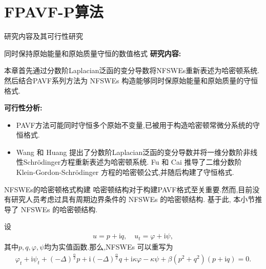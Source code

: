 \documentclass[aspectratio=169]{beamer}
\numberwithin{theorem}{section} %
\numberwithin{equation}{section}%
\numberwithin{figure}{section}%
\numberwithin{table}{section}%
\begin{document}
\section{FPAVF-P算法}
\begin{frame}{研究内容及其可行性研究}
	\begin{block}{同时保持原始能量和原始质量守恒的数值格式}
		\textbf{\textcolor[rgb]{0.227,0.373,0.306}{研究内容:}}
		
		{\footnotesize 本章首先通过分数阶Laplacian泛函的变分导数将NFSWEs重新表述为哈密顿系统.然后结合PAVF系列方法为 NFSWEs 构造能够同时保原始能量和原始质量的守恒格式.}
		
		\textbf{\textcolor[rgb]{0.227,0.373,0.306}{可行性分析:}}
		\begin{itemize}
			\item {\footnotesize PAVF方法可能同时守恒多个原始不变量,已被用于构造哈密顿常微分系统的守恒格式\cite{caiPartitionedAveragedVector2018}.​​​​​​​​​​​​​​​​​​​​​​​​​​​​​​​​​​​​​​​​​​​​​​​​​​​​​​​​​​​​​​​​​​​​​​​​​​​​​​​​​​​​​​​​​​​​​​​​​​​​​​​​​​​​​​​​​​​​​​​​​​​​​​​​​​​​​​​​​​​​​​​​​​​​​​​​​​​​​​​​​​​​​​​​​​​​​​​​​​​​​​​​​​​​​​​​​​​​​​​​​​​​​​​​​​​​​​​​​​​​​​​​​​​​​​​​​​​​​​​​​​​​​​​​​​​​​​​​​​​​​​​​​​​​​​​​​​​​​​​​​​​​​​​​​​​​​​​​​​​​​​​​​​​​​​​​​​​​​​​​​​}
			\item {\footnotesize Wang 和 Huang \cite{wangStructurepreservingNumericalMethods2018} 提出了分数阶Laplacian泛函的变分导数并将一维分数阶非线性Schrödinger方程重新表述为哈密顿系统.
			Fu 和 Cai \cite{fuStructurepreservingAlgorithmsTwodimensional2020} 推导了二维分数阶 Klein-Gordon-Schrödinger 方程的哈密顿公式,并随后构建了守恒格式.}
			\end{itemize}
	\end{block}
	\end{frame}

\begin{frame}{NFSWEs的哈密顿格式构建}
	哈密顿结构对于构建PAVF格式至关重要.然而,目前没有研究人员考虑过具有周期边界条件的 NFSWEs 的哈密顿结构.
	基于此, 本小节推导了 NFSWEs 的哈密顿结构.
	
	设
	\begin{align}
	u = p+\mathrm{i}q, \quad u_t = \varphi+ \mathrm{i}\psi,
	\end{align}
	其中$p, q,\varphi,\psi$均为实值函数.那么,NFSWEs  可以重写为
	\begin{align}\label{eq_PAVF:28}
	\varphi_{t}+\mathrm{i}\psi_{t}+\left( -\Delta \right) ^{\frac{\alpha }{2}}p+\mathrm{i}\left( -\Delta \right) ^{\frac{\alpha }{2}}q+\mathrm{i}\kappa \varphi-\kappa \psi+\beta \left( p^{2}+q^{2}\right) \left( p+\mathrm{i} q\right) =0.
	\end{align}
	\end{frame}
\end{document}
